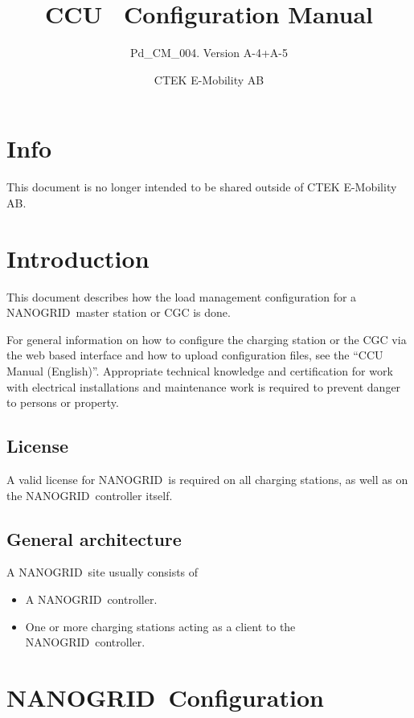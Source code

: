 \documentclass[10pt,a4paper,oneside,headings=big,headsepline]{scrreprt}
\author{CTEK E-Mobility AB}
\title{CCU \nanogrid\ Configuration Manual}
\subtitle{Pd\_CM\_004. Version A-4+A-5}
\newcommand{\nanogrid}{NANOGRID\texttrademark}
\begin{document}
\maketitle
\chapter*{Info}
This document is no longer intended to be shared outside of CTEK E-Mobility
AB.

\tableofcontents


\chapter{Introduction}

This document describes how the load management configuration for a \nanogrid\
master station or CGC is done.

For general information on how to configure the charging station or the CGC
via the web based interface and how to upload configuration files, see the
``CCU Manual (English)''. Appropriate technical knowledge and certification
for work with electrical installations and maintenance work is required to
prevent danger to persons or property.

\section{License}
\label{sec:license}

A valid license for \nanogrid\ is required on all charging stations, as well
as on the \nanogrid\ controller itself.

\section{General architecture}
\label{sec:general-architecture}

A \nanogrid\ site usually consists of
\begin{itemize}
\item A \nanogrid\ controller.
\item One or more charging stations acting as a client to the \nanogrid\
  controller.

\end{itemize}


\chapter{\nanogrid\ Configuration}
\end{document}

